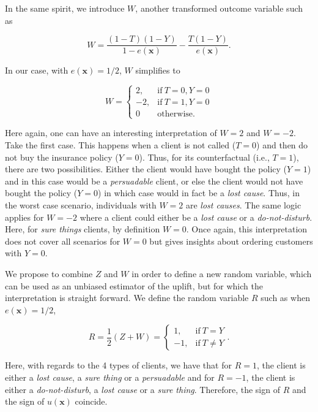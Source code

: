 \documentclass{article}
\def\x{\mathbf x}
\begin{document}
In the same spirit, we introduce $W$, another transformed outcome variable such as

\begin{equation}
    W =  \frac{(1-T)(1-Y)}{1-e(\x)} - \frac{T (1-Y)}{e(\x)}.
    \label{eq:transformed_outcome_w}
\end{equation}

In our case, with $e(\x) = 1/2$, $W$ simplifies to

\[ W = \begin{cases} 
      2, & \mathrm{if}~T=0, Y=0 \\
      -2, & \mathrm{if}~T=1, Y=0 \\
      0 & \mathrm{otherwise.} 
   \end{cases}
\]

Here again, one can have an interesting interpretation of $W=2$ and $W=-2$. Take the first case. This happens when a client is not called ($T = 0$) and then do not buy the insurance policy ($Y = 0$). Thus, for its counterfactual (i.e., $T = 1$), there are two possibilities. Either the client would have bought the policy ($Y = 1$) and in this case would be a \textit{persuadable} client, or else the client would not have bought the policy ($Y = 0$) in which case would in fact be a \textit{lost cause}. Thus, in the worst case scenario, individuals with $W = 2$ are \textit{lost causes}. The same logic applies for $W = -2$ where a client could either be a \textit{lost cause} or a \textit{do-not-disturb}. Here, for \textit{sure things} clients, by definition $W = 0$. Once again, this interpretation does not cover all scenarios for $W=0$ but gives insights about ordering customers with $Y=0$.

We propose to combine $Z$ and $W$ in order to define a new random variable, which can be used as an unbiased estimator of the uplift, but for which the interpretation is straight forward. We define the random variable $R$ such as when $e(\x) = 1/2$, 

\begin{equation}
   R =  \frac{1}{2} (Z + W)  = \begin{cases} 
      1, & \mathrm{if} ~ T = Y \\
      -1, & \mathrm{if} ~ T \neq Y
   \end{cases}.
    \label{eq:transformed_outcome_sign}
\end{equation}


Here, with regards to the 4 types of clients, we have that for $R=1$, the client is either a \textit{lost cause}, a \textit{sure thing} or a \textit{persuadable} and for $R=-1$, the client is either a \textit{do-not-disturb}, a \textit{lost cause} or a \textit{sure thing}. Therefore, the sign of $R$ and the sign of $u(\x)$ coincide.
\end{document}
